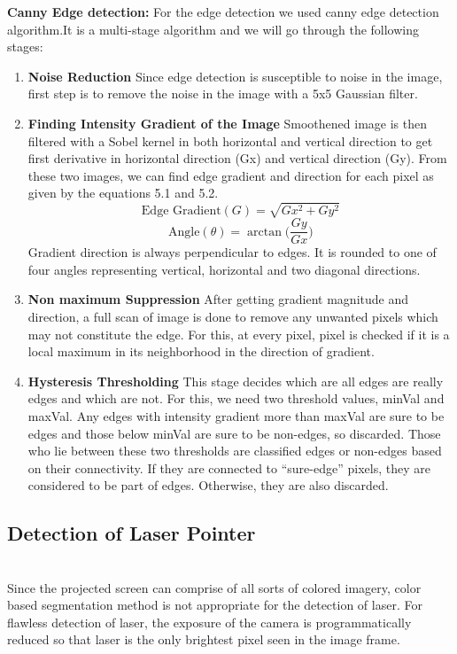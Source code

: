 \documentclass[12pt, a4paper]{article}
\begin{document}
\textbf{Canny Edge detection:}
For the edge detection we used canny edge detection algorithm.It is a multi-stage algorithm and we will go through the following stages:
\begin{enumerate}
\item \textbf {Noise Reduction}
Since edge detection is susceptible to noise in the image, first step is to remove the noise in the image with a 5x5 Gaussian filter.

\item \textbf{Finding Intensity Gradient of the Image}
Smoothened image is then filtered with a Sobel kernel in both horizontal and vertical direction to get first derivative in horizontal direction (Gx) and vertical direction (Gy). From these two images, we can find edge gradient and direction for each pixel as given by the equations 5.1 and 5.2.
\begin{equation}
\text{Edge Gradient}(G) = \sqrt{Gx^2 + Gy^2}
\end{equation}
\begin{equation}
\text{Angle}(\theta) = \arctan\bigg(\frac{Gy}{Gx}\bigg)
\end{equation}
Gradient direction is always perpendicular to edges. It is rounded to one of four angles   representing vertical, horizontal and two diagonal directions.
\item \textbf{Non maximum Suppression}
After getting gradient magnitude and direction, a full scan of image is done to remove any unwanted pixels which may not constitute the edge. For this, at every pixel, pixel is checked ­if it is a local maximum in its neighborhood in the direction of gradient.

\item \textbf{Hysteresis Thresholding}
This stage decides which are all edges are really edges and which are not. For this, we need two threshold values, minVal and maxVal. Any edges with intensity gradient more than maxVal are sure to be edges and those below minVal are sure to be non-edges, so discarded. Those who lie between these two thresholds are classified edges or non-edges based on their connectivity. If they are connected to “sure-edge” pixels, they are considered to be part of edges. Otherwise, they are also discarded.
\end{enumerate}
	
\subsection{Detection of Laser Pointer}
~\\
	Since the projected screen can comprise of all sorts of colored imagery, color based segmentation method is not appropriate for the detection of laser. For flawless detection of laser, the exposure of the camera is programmatically reduced so that laser is the only brightest pixel seen in the image frame. 
\end{document}
